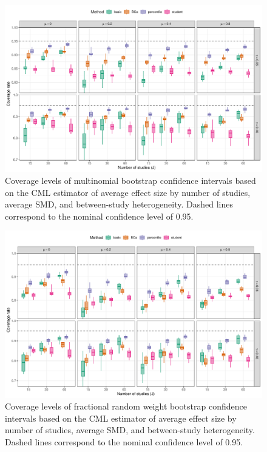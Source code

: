 \documentclass[
  american,
  man, donotrepeattitle,floatsintext]{apa7}
\begin{document}
\begin{figure}
\includegraphics{step-function-selection-models-with-dependent-effects_files/figure-latex/CML-coverage-multinomial-1} \caption{Coverage levels of multinomial bootstrap confidence intervals based on the CML estimator of average effect size by number of studies, average SMD, and between-study heterogeneity. Dashed lines correspond to the nominal confidence level of 0.95.}\label{fig:CML-coverage-multinomial}
\end{figure}

\begin{figure}
\includegraphics{step-function-selection-models-with-dependent-effects_files/figure-latex/CML-coverage-exponential-1} \caption{Coverage levels of fractional random weight bootstrap confidence intervals based on the CML estimator of average effect size by number of studies, average SMD, and between-study heterogeneity. Dashed lines correspond to the nominal confidence level of 0.95.}\label{fig:CML-coverage-exponential}
\end{figure}
\end{document}
